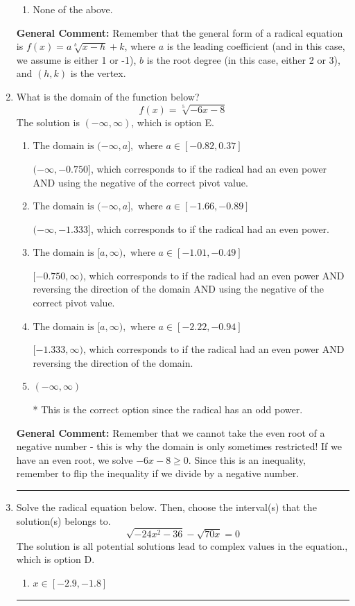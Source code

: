 \documentclass{extbook}[14pt]
\newcommand{\litem}[1]{\item #1

\rule{\textwidth}{0.4pt}}
\begin{document}
\begin{enumerate}
{\begin{enumerate}[label=\Alph*.]
\begin{multicols}{2}
\end{multicols}\item None of the above.\end{enumerate}
\textbf{General Comment:} Remember that the general form of a radical equation is $ f(x) = a \sqrt[b]{x - h} + k $, where $a$ is the leading coefficient (and in this case, we assume is either 1 or -1), $b$ is the root degree (in this case, either 2 or 3), and $(h, k)$ is the vertex.
}
\litem{
What is the domain of the function below?
\[ f(x) = \sqrt[5]{-6 x - 8} \]The solution is \( (-\infty, \infty) \), which is option E.\begin{enumerate}[label=\Alph*.]
\item \( \text{The domain is } (-\infty, a], \text{   where } a \in [-0.82, 0.37] \)

$(-\infty, -0.750]$, which corresponds to if the radical had an even power AND using the negative of the correct pivot value.
\item \( \text{The domain is } (-\infty, a], \text{   where } a \in [-1.66, -0.89] \)

$(-\infty, -1.333]$, which corresponds to if the radical had an even power.
\item \( \text{The domain is } [a, \infty), \text{   where } a \in [-1.01, -0.49] \)

$[-0.750, \infty)$, which corresponds to if the radical had an even power AND reversing the direction of the domain AND using the negative of the correct pivot value.
\item \( \text{The domain is } [a, \infty), \text{   where } a \in [-2.22, -0.94] \)

$[-1.333, \infty)$, which corresponds to if the radical had an even power AND reversing the direction of the domain.
\item \( (-\infty, \infty) \)

* This is the correct option since the radical has an odd power.
\end{enumerate}

\textbf{General Comment:} Remember that we cannot take the even root of a negative number - this is why the domain is only sometimes restricted! If we have an even root, we solve $-6 x - 8 \geq 0$. Since this is an inequality, remember to flip the inequality if we divide by a negative number.
}
\litem{
Solve the radical equation below. Then, choose the interval(s) that the solution(s) belongs to.
\[ \sqrt{-24 x^2 - 36} - \sqrt{70 x} = 0 \]The solution is \( \text{all potential solutions lead to complex values in the equation.} \), which is option D.\begin{enumerate}[label=\Alph*.]
\item \( x \in [-2.9,-1.8] \)


\end{enumerate}}
\end{enumerate}
\end{document}
